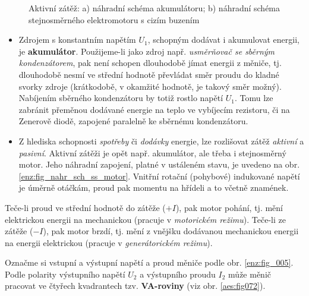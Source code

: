       \begin{figure}[ht!]
        \centering
        \hspace{1cm}
        \caption{Aktivní zátěž: a) náhradní schéma akumulátoru; b) náhradní schéma stejnosměrného 
          elektromotoru s cizím buzením}
        \label{enz:fig_aktivni_zatez}
      \end{figure}        
      \begin{itemize}[noitemsep]
        \item Zdrojem s konstantním napětím $U_1$, schopným dodávat i akumulovat energii, je
              \textbf{akumulátor}. Použijeme-li jako zdroj např.\emph{ usměrňovač se sběrným 
              kondenzátorem}, pak není schopen dlouhodobě jímat energii z měniče, tj. dlouhodobě 
              nesmí ve střední hodnotě převládat směr proudu do kladné svorky zdroje (krátkodobě, 
              v okamžité hodnotě, je takový směr možný). Nabíjením sběrného kondenzátoru by totiž 
              rostlo napětí $U_1$. Tomu lze zabránit přeměnou dodávané energie na teplo ve 
              vybíjecím rezistoru, či na Zenerově diodě, zapojené paralelně ke sběrnému 
              kondenzátoru.
        \item Z hlediska schopnosti \emph{spotřeby} či \emph{dodávky} energie, lze rozlišovat 
              zátěž \emph{aktivní} a \emph{pasivní}. Aktivní zátěži je opět např. akumulátor, ale 
              třeba i stejnosměrný motor. Jeho náhradní zapojení, platné v ustáleném stavu, je 
              uvedeno na obr. \ref{enz:fig_nahr_sch_ss_motor}. Vnitřní rotační (pohybové) 
              indukované napětí je úměrně otáčkám, proud pak momentu na hřídeli a to včetně 
              znamének.
      \end{itemize}
      

      Teče-li proud ve  střední hodnotě do zátěže (\(+I\)), pak motor pohání, tj. mění elektrickou
      energii na mechanickou (pracuje v \emph{motorickém režimu}). Teče-li ze zátěže (\(-I\)), pak
      motor brzdí, tj. mění z vnějšku dodávanou mechanickou energii na energii elektrickou
      (pracuje v \emph{generátorickém režimu}).       
      
      Označme si vstupní a výstupní napětí a proud měniče podle obr. \ref{enz:fig_005}. Podle 
      polarity výstupního napětí $U_2$ a výstupního proudu $I_2$ může měnič pracovat ve čtyřech 
      kvadrantech tzv.\textbf{ VA-roviny} (viz obr. \ref{aes:fig072}).

